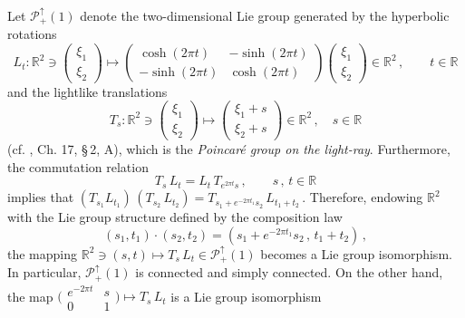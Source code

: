 \documentclass[reqno]{amsart}
\theoremstyle{definition}
\theoremstyle{remark}
\numberwithin{equation}{section}
\theoremstyle{plain}
\begin{document}
Let $\mathcal P_+^\uparrow (1)$ denote the two-dimensional
Lie group generated by the hyperbolic rotations
\begin{equation*}
L_t : \mathbb R^2\ni \left( \begin{array}{c} \xi_1\\ \xi_2
\end{array}\right)\longmapsto\left( \begin{array}{rr}
\cosh (2\pi t) &-\sinh (2\pi t)\\ -\sinh (2\pi t) &\cosh (2\pi t)
\end{array}\right) \left(\begin{array}{c} \xi_1\\ \xi_2
\end{array} \right)\in\mathbb R^2\, ,\qquad t\in\mathbb R
\end{equation*}
and the lightlike translations
\begin{equation*}
T_s : \mathbb R^2\ni \left( \begin{array}{c} \xi_1 \\ \xi_2
\end{array}\right)\longmapsto\left( \begin{array}{c} \xi_1 +s\\
\xi_2 +s\end{array}\right)\in\mathbb R^2\, ,\quad s\in\mathbb R
\end{equation*}
(cf. \cite{Ba-Ra}, Ch. 17, \S$\,$2, A), which is the \emph{Poincar\'e
group on the light-ray}. Furthermore, the commutation relation
\begin{equation*}
T_s\, L_t =L_t\, T_{e^{2\pi t} s}\, ,\qquad s\, ,\, t\in\mathbb R
\end{equation*}
implies that $(T_{s_1} L_{t_1})\, (T_{s_2}\, L_{t_2}) =T_{s_1 +
e^{-2\pi t_1} s_2}\, L_{t_1+t_2}\,$. Therefore, endowing $\mathbb R^2$
with the Lie group structure defined by the composition law
\begin{equation*}
(s_1 ,t_1)\cdot (s_2 ,t_2) = (s_1 +e^{-2\pi t_1} s_2\, ,\,
t_1+t_2 )\, ,
\end{equation*}
the mapping $\mathbb R^2\ni (s ,t)\longmapsto T_s\, L_t\in
\mathcal P_+^\uparrow (1)$ becomes a Lie group isomorphism. In
particular, $\mathcal P_+^\uparrow (1)$ is connected and simply
connected. On the other hand, the map
$\displaystyle \Big( \begin{array}{cc} e^{-2\pi t} & s\\ 0 & 1
\end{array}\Big)\longmapsto T_s\, L_t$ is a Lie group isomorphism
\end{document}
